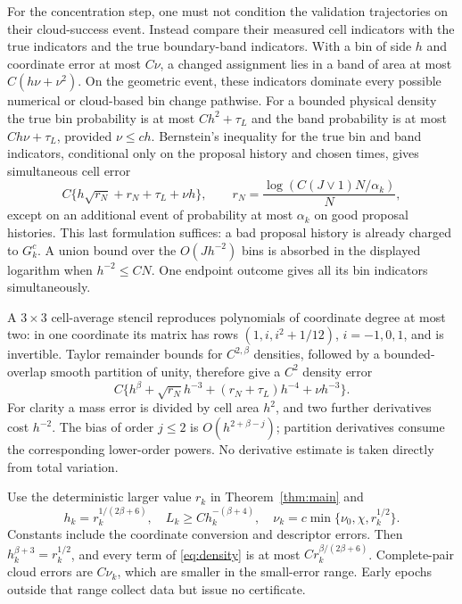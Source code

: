 For the concentration step, one must not condition the validation
trajectories on their cloud-success event. Instead compare their measured
cell indicators with the true indicators and the true boundary-band
indicators. With a bin of side $h$ and coordinate error at most $C\nu$,
a changed assignment lies in a band of area at most $C(h\nu+\nu^2)$.
On the geometric event, these indicators dominate every possible
numerical or cloud-based bin change pathwise. For a bounded physical
density the true bin probability is at most $C h^2+\tau_L$ and the
band probability is at most $C h\nu+\tau_L$, provided $\nu\le c h$.
Bernstein's inequality for the true bin and band indicators, conditional
only on the proposal history and chosen times, gives simultaneous cell
error
\begin{equation}\label{eq:cell}
 C\{h\sqrt{r_N}+r_N+\tau_L+\nu h\},\qquad
 r_N=\frac{\log(C(J\vee1)N/\alpha_k)}{N},
\end{equation}
except on an additional event of probability at most $\alpha_k$ on
good proposal histories. This last formulation suffices: a bad proposal
history is already charged to $G_k^c$. A union bound over the
$O(Jh^{-2})$ bins is absorbed in the displayed logarithm when $h^{-2}\le CN$.
One endpoint outcome gives all its bin indicators simultaneously.

A $3\times3$ cell-average stencil reproduces polynomials of coordinate
degree at most two: in one coordinate its matrix has rows
$(1,i,i^2+1/12)$, $i=-1,0,1$, and is invertible. Taylor remainder bounds
for $C^{2,\beta}$ densities, followed by a bounded-overlap smooth
partition of unity, therefore give a $C^2$ density error
\begin{equation}\label{eq:density}
 C\{h^\beta+\sqrt{r_N}h^{-3}+(r_N+\tau_L)h^{-4}+\nu h^{-3}\}.
\end{equation}
For clarity a mass error is divided by cell area $h^2$, and two further
derivatives cost $h^{-2}$. The bias of order $j\le2$ is
$O(h^{2+\beta-j})$; partition derivatives consume the corresponding
lower-order powers. No derivative estimate is taken directly from
total variation.

Use the deterministic larger value $r_k$ in Theorem~\ref{thm:main} and
\begin{equation}\label{eq:schedule}
 h_k=r_k^{1/(2\beta+6)},\quad L_k\ge C h_k^{-(\beta+4)},\quad
 \nu_k=c\min\{\nu_0,\chi,r_k^{1/2}\}.
\end{equation}
Constants include the coordinate conversion and descriptor errors.
Then $h_k^{\beta+3}=r_k^{1/2}$, and every term of \eqref{eq:density}
is at most $C r_k^{\beta/(2\beta+6)}$. Complete-pair cloud errors are
$C\nu_k$, which are smaller in the small-error range. Early epochs
outside that range collect data but issue no certificate.

